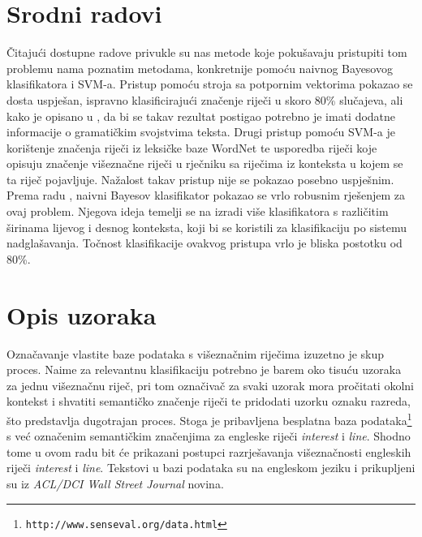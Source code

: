 \documentclass[10pt, a4paper]{article}
\begin{document}
\section{Srodni radovi}
Čitajući dostupne radove privukle su nas metode koje
pokušavaju pristupiti tom problemu nama poznatim metodama,
konkretnije pomoću naivnog Bayesovog klasifikatora i SVM-a.
Pristup pomoću stroja sa potpornim vektorima pokazao se dosta
uspješan, ispravno klasificirajući značenje riječi
u skoro 80\% slučajeva, ali kako je opisano u \citep{lee-etc}, da bi se takav
rezultat postigao
potrebno je imati dodatne informacije
o gramatičkim svojstvima teksta. Drugi pristup
pomoću SVM-a je korištenje značenja  riječi
iz leksičke baze WordNet \citep{buscaldi-etc} te usporedba riječi koje opisuju
značenje višeznačne riječi u rječniku sa riječima
iz konteksta u kojem se ta riječ pojavljuje. Nažalost takav pristup
nije se pokazao posebno uspješnim.
Prema radu \citep{pedersen}, naivni Bayesov klasifikator
pokazao se vrlo robusnim rješenjem za ovaj problem.
Njegova ideja temelji se na izradi više klasifikatora s različitim
širinama lijevog i desnog konteksta,
koji bi se koristili za klasifikaciju po sistemu nadglašavanja.
Točnost klasifikacije ovakvog pristupa vrlo je bliska postotku od 80\%.

\section{Opis uzoraka}
Označavanje vlastite baze podataka s višeznačnim riječima izuzetno je
skup proces. Naime za relevantnu klasifikaciju potrebno je barem
oko tisuću uzoraka za jednu višeznačnu riječ, pri tom
označivač za svaki uzorak mora pročitati okolni kontekst i 
shvatiti semantičko značenje riječi te pridodati uzorku oznaku razreda,
što predstavlja dugotrajan proces. Stoga je pribavljena besplatna
baza podataka\footnote{\texttt{http://www.senseval.org/data.html}} s već označenim semantičkim
značenjima za engleske riječi \emph{interest} i \emph{line}. Shodno tome u ovom radu bit će prikazani
postupci razrješavanja višeznačnosti engleskih riječi \emph{interest} i \emph{line}.
Tekstovi u bazi podataka su na engleskom jeziku
i prikupljeni su iz \emph{ACL/DCI Wall Street Journal} novina.
\end{document}
